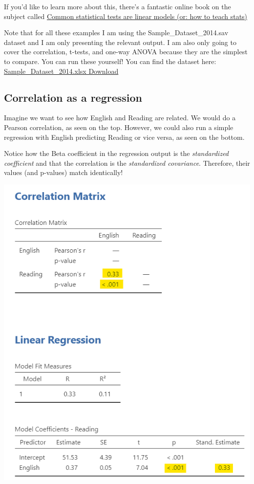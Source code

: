 \documentclass[
]{book}
\begin{document}
If you'd like to learn more about this, there's a fantastic online book on the subject called \href{https://lindeloev.github.io/tests-as-linear/}{Common statistical tests are linear models (or: how to teach stats)}

Note that for all these examples I am using the Sample\_Dataset\_2014.sav dataset and I am only presenting the relevant output. I am also only going to cover the correlation, t-tests, and one-way ANOVA because they are the simplest to compare. You can run these yourself! You can find the dataset here: \href{https://github.com/danawanzer/stats-with-jamovi/blob/master/data/Sample_Dataset_2014.xlsx}{Sample\_Dataset\_2014.xlsx Download}

\hypertarget{correlation-as-a-regression}{%
\subsection{Correlation as a regression}\label{correlation-as-a-regression}}

Imagine we want to see how English and Reading are related. We would do a Pearson correlation, as seen on the top. However, we could also run a simple regression with English predicting Reading or vice versa, as seen on the bottom.

Notice how the Beta coefficient in the regression output is the \emph{standardized coefficient} and that the correlation is the \emph{standardized covariance}. Therefore, their values (and p-values) match identically!

\includegraphics{images/14-regression-wrap-up/correlation.png}
\end{document}
